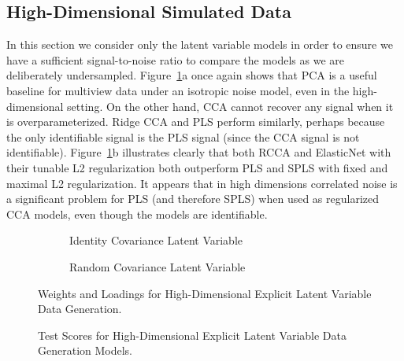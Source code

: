 \subsection{High-Dimensional Simulated Data}
In this section we consider only the latent variable models in order to ensure we have a sufficient signal-to-noise ratio to compare the models as we are deliberately undersampled.
Figure~\ref{fig:latent-variable-weights-loadings-high}a once again shows that PCA is a useful baseline for multiview data under an isotropic noise model, even in the high-dimensional setting.
On the other hand, CCA cannot recover any signal when it is overparameterized.
Ridge CCA and PLS perform similarly, perhaps because the only identifiable signal is the PLS signal (since the CCA signal is not identifiable).
Figure~\ref{fig:latent-variable-weights-loadings-high}b illustrates clearly that both RCCA and ElasticNet with their tunable L2 regularization both outperform PLS and SPLS with fixed and maximal L2 regularization.
It appears that in high dimensions correlated noise is a significant problem for PLS (and therefore SPLS) when used as regularized CCA models, even though the models are identifiable.

\begin{figure}
\centering
\begin{subfigure}{0.49\linewidth}
\centering

\caption{Identity Covariance Latent Variable}
\end{subfigure}
%
\begin{subfigure}{0.49\linewidth}
\centering

\caption{Random Covariance Latent Variable}
\end{subfigure}
\caption{Weights and Loadings for High-Dimensional Explicit Latent Variable Data Generation.}\label{fig:latent-variable-weights-loadings-high}
\end{figure}

\begin{figure}
\centering
\begin{subfigure}{0.49\linewidth}
\centering

\caption{}
\end{subfigure}
%
\begin{subfigure}{0.49\linewidth}
\centering

\caption{}
\end{subfigure}
\caption{Test Scores for High-Dimensional Explicit Latent Variable Data Generation Models.}\label{fig:latent-variable-scores-high}
\end{figure}


